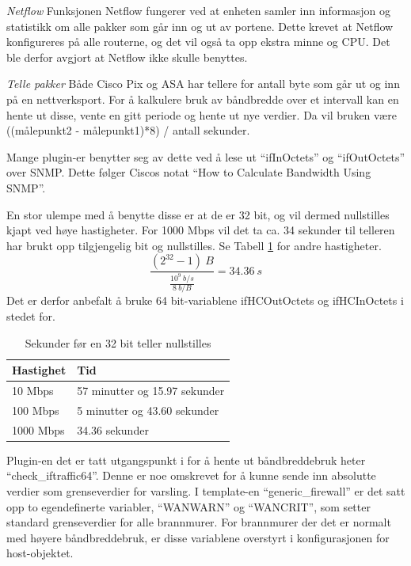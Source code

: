 \textit{Netflow}
Funksjonen Netflow\cite{ciscoiosnetflow} fungerer ved at enheten samler inn informasjon og statistikk om alle pakker som går inn og ut av portene. Dette krevet at Netflow konfigureres på alle routerne, og det vil også ta opp ekstra minne og CPU\cite{cisconetflowperf}. Det ble derfor avgjort at Netflow ikke skulle benyttes.

\textit{Telle pakker}
Både Cisco Pix og ASA har tellere for antall byte som går ut og inn på en nettverksport. For å kalkulere bruk av båndbredde over et intervall kan en hente ut disse, vente en gitt periode og hente ut nye verdier. Da vil bruken være ((målepunkt2 - målepunkt1)*8) / antall sekunder.

Mange plugin-er benytter seg av dette ved å lese ut ``ifInOctets'' og ``ifOutOctets'' over SNMP. Dette følger Ciscos notat ``How to Calculate Bandwidth Using SNMP''\cite{ciscobandwidth}. 

En stor ulempe med å benytte disse er at de er 32 bit, og vil dermed nullstilles kjapt ved høye hastigheter. For 1000 Mbps vil det ta ca. 34 sekunder til telleren har brukt opp tilgjengelig bit og nullstilles. Se Tabell \ref{kalkulering_teller} for andre hastigheter.
\[\frac{(2^{32}-1)\:B}{\frac{10^9\:b/s}{8\:b/B}}=34.36\:s \] 
Det er derfor anbefalt å bruke 64 bit-variablene ifHCOutOctets og ifHCInOctets i stedet for\cite{ciscosnmpcounters}.
\begin{table}[H]
\begin{center}
\begin{tabular}{ | l | p{7cm} |} \hline
    \textbf{Hastighet} & \textbf{Tid} \\ \hline
    10 Mbps & 57 minutter og 15.97 sekunder \\ \hline
    100 Mbps & 5 minutter og 43.60 sekunder \\ \hline
    1000 Mbps & 34.36 sekunder \\ \hline
\end{tabular}
\caption{Sekunder før en 32 bit teller nullstilles }
\label{kalkulering_teller}
\end{center}
\end{table}
Plugin-en det er tatt utgangspunkt i for å hente ut båndbreddebruk heter ``check\_iftraffic64\cite{checkciscoif}''. Denne er noe omskrevet for å kunne sende inn absolutte verdier som grenseverdier for varsling. I template-en ``generic\_firewall'' er det satt opp to egendefinerte variabler, ``WANWARN'' og ``WANCRIT'', som setter standard grenseverdier for alle brannmurer. For brannmurer der det er normalt med høyere båndbreddebruk, er disse variablene overstyrt i konfigurasjonen for host-objektet.

